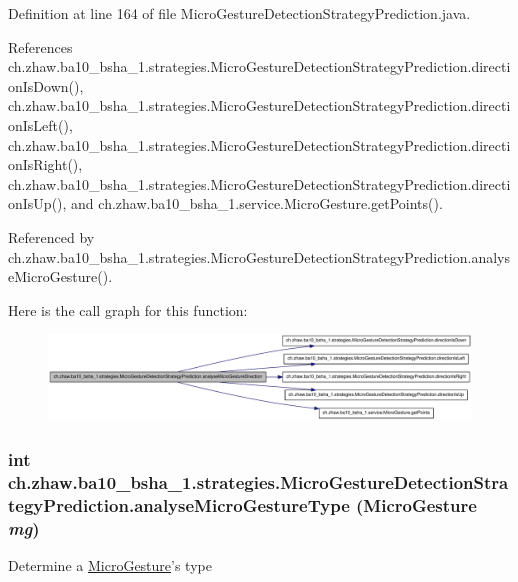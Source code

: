 Definition at line 164 of file MicroGestureDetectionStrategyPrediction.java.

References ch.zhaw.ba10\_\-bsha\_\-1.strategies.MicroGestureDetectionStrategyPrediction.directionIsDown(), ch.zhaw.ba10\_\-bsha\_\-1.strategies.MicroGestureDetectionStrategyPrediction.directionIsLeft(), ch.zhaw.ba10\_\-bsha\_\-1.strategies.MicroGestureDetectionStrategyPrediction.directionIsRight(), ch.zhaw.ba10\_\-bsha\_\-1.strategies.MicroGestureDetectionStrategyPrediction.directionIsUp(), and ch.zhaw.ba10\_\-bsha\_\-1.service.MicroGesture.getPoints().

Referenced by ch.zhaw.ba10\_\-bsha\_\-1.strategies.MicroGestureDetectionStrategyPrediction.analyseMicroGesture().

Here is the call graph for this function:\nopagebreak
\begin{figure}[H]
\begin{center}
\leavevmode
\includegraphics[width=420pt]{classch_1_1zhaw_1_1ba10__bsha__1_1_1strategies_1_1MicroGestureDetectionStrategyPrediction_a756c6343fc5cb131a57b00f638ca1c3d_cgraph}
\end{center}
\end{figure}
\hypertarget{classch_1_1zhaw_1_1ba10__bsha__1_1_1strategies_1_1MicroGestureDetectionStrategyPrediction_a7a6bce4151aab292c0e6895257364601}{
\subsubsection[{analyseMicroGestureType}]{\setlength{\rightskip}{0pt plus 5cm}int ch.zhaw.ba10\_\-bsha\_\-1.strategies.MicroGestureDetectionStrategyPrediction.analyseMicroGestureType ({\bf MicroGesture} {\em mg})}}
\label{classch_1_1zhaw_1_1ba10__bsha__1_1_1strategies_1_1MicroGestureDetectionStrategyPrediction_a7a6bce4151aab292c0e6895257364601}
Determine a \hyperlink{}{MicroGesture}'s type


